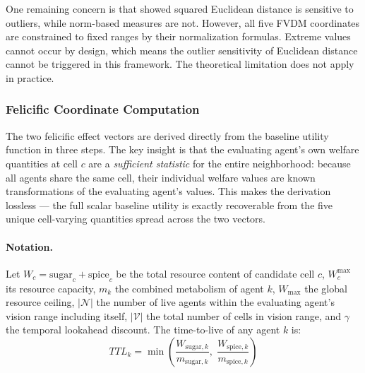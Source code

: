 \documentclass{icsthesis}
\begin{document}
\begin{mainmatter}
One remaining concern is that \citet{Rubinov2010} showed squared Euclidean distance is sensitive to outliers, while norm-based measures are not. However, all five FVDM coordinates are constrained to fixed ranges by their normalization formulas. Extreme values cannot occur by design, which means the outlier sensitivity of Euclidean distance cannot be triggered in this framework. The theoretical limitation does not apply in practice.


\subsubsection{Felicific Coordinate Computation}
\label{sec:coordinate_computation}

The two felicific effect vectors are derived directly from the baseline utility function in three steps. The key insight is that the evaluating agent’s own welfare quantities at cell $c$ are a \emph{sufficient statistic} for the entire neighborhood: because all agents share the same cell, their individual welfare values are known transformations of the evaluating agent’s values. This makes the derivation lossless --- the full scalar baseline utility is exactly recoverable from the five unique cell-varying quantities spread across the two vectors.

\paragraph{Notation.}
Let $W_c = \mathrm{sugar}_c + \mathrm{spice}_c$ be the total resource content of candidate cell $c$, $W_c^{\max}$ its resource capacity, $m_k$ the combined metabolism of agent $k$, $W_{\max}$ the global resource ceiling, $|\mathcal{N}|$ the number of live agents within the evaluating agent’s vision range including itself, $|\mathcal{V}|$ the total number of cells in vision range, and $\gamma$ the temporal lookahead discount. The time-to-live of any agent $k$ is:
\[
TTL_k = \min\!\left(\frac{W_{\mathrm{sugar},k}}{m_{\mathrm{sugar},k}},\; \frac{W_{\mathrm{spice},k}}{m_{\mathrm{spice},k}}\right)
\]


\end{mainmatter}
\end{document}
